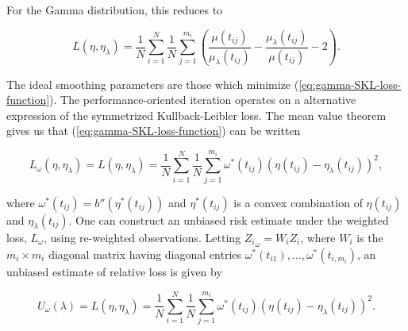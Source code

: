 \noindent
For the Gamma distribution, this reduces to 

\begin{equation}\label{eq:gamma-SKL-loss-function}
L\left( \eta,\eta_\lambda \right) = \frac{1}{N}\sum_{i=1}^N \frac{1}{N}\sum_{j=1}^{m_i}  \left( \frac{\mu\left(t_{ij}\right)}{\mu_\lambda\left(t_{ij}\right)} - \frac{\mu_\lambda \left(t_{ij}\right)}{\mu\left(t_{ij}\right)} - 2\right).
\end{equation}


\noindent The ideal smoothing parameters are those which minimize (\ref{eq:gamma-SKL-loss-function}). The performance-oriented iteration operates on a alternative expression of the symmetrized Kullback-Leibler loss. The mean value theorem gives us that (\ref{eq:gamma-SKL-loss-function}) can be written

\begin{equation}\label{eq:gamma-SKL-loss-function-mvt}
L_\omega\left( \eta,\eta_\lambda \right) = L\left( \eta,\eta_\lambda \right) = \frac{1}{N}\sum_{i=1}^N \frac{1}{N}\sum_{j=1}^{m_i} \omega^*\left(t_{ij}\right)  \left( \eta\left(t_{ij}\right) - \eta_\lambda\left(t_{ij}\right)\right)^2,
\end{equation}

\noindent
where $\omega^*\left(t_{ij}\right) = b''\left(\eta^*\left(t_{ij}\right)\right)$ and $\eta^*\left(t_{ij}\right)$ is a convex combination of  $\eta\left(t_{ij}\right)$ and $\eta_\lambda\left(t_{ij}\right)$. One can construct an unbiased risk estimate under the weighted loss, $L_\omega$, using re-weighted observations. Letting ${Z_{i}}_\omega = W_i Z_i$, where $W_i$ is the $m_i \times m_i$ diagonal matrix having diagonal entries $\omega^*\left(t_{i1}\right), \dots, \omega^*\left(t_{i,m_i}\right)$, an unbiased estimate of relative loss is given by 

\begin{equation}\label{eq:weighted-unbiased-risk-estimate}
U_\omega\left( \lambda \right) = L\left( \eta,\eta_\lambda \right) = \frac{1}{N}\sum_{i=1}^N \frac{1}{N}\sum_{j=1}^{m_i} \omega^*\left(t_{ij}\right)  \left( \eta\left(t_{ij}\right) - \eta_\lambda\left(t_{ij}\right)\right)^2.
\end{equation}

